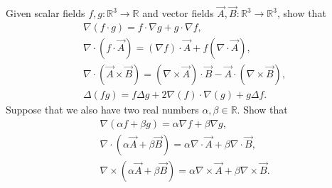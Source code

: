 \documentclass[11pt]{article}
\begin{document}
\begin{exercise}
	Given scalar fields $f, g : \mathbb{R}^3 \to \mathbb{R}$ and vector fields $\vec{A}, \vec{B} : \mathbb{R}^3 \to \mathbb{R}^3$,
    show that 
    \begin{gather*}
        \nabla\left( f \cdot g \right)
        = 
        f \cdot \nabla g
        +
        g \cdot \nabla f
        ,
        \\
        \nabla\cdot\left( f \cdot \vec{A} \right)
        = 
        ( \nabla f ) \cdot \vec{A}
        +
        f ( \nabla \cdot \vec{A} )
        ,
        \\ 
        \nabla\cdot\left( \vec{A} \times \vec{B} \right)
        = 
        \left( \nabla\times\vec{A} \right) \cdot \vec{B}
        -
        \vec{A} \cdot \left( \nabla\times\vec{B} \right)
        ,
        \\ 
        \Delta ( f g )
        = 
        f \Delta g + 2 \nabla(f) \cdot \nabla( g ) + g \Delta f
        .
    \end{gather*}
    Suppose that we also have two real numbers $\alpha, \beta \in \mathbb R$.
    Show that 
    \begin{gather*}
        \nabla( \alpha f + \beta g )
        = 
        \alpha \nabla f + \beta \nabla g
        ,
        \\ 
        \nabla\cdot ( \alpha \vec{A} + \beta \vec{B} )
        = 
        \alpha \nabla\cdot \vec{A} + \beta \nabla\cdot \vec{B}
        ,
        \\ 
        \nabla\times ( \alpha \vec{A} + \beta \vec{B} )
        = 
        \alpha \nabla\times \vec{A} + \beta \nabla\times \vec{B}
        .
    \end{gather*}
\end{exercise}
\end{document}
